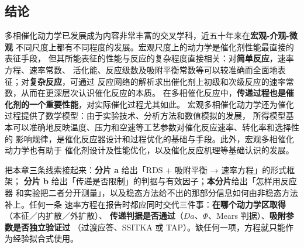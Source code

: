 \subsection{结论}

多相催化动力学已发展成为内容非常丰富的交叉学科，近五十年来在\textbf{宏观-介观-微观}
不同尺度上都有不同程度的发展。宏观尺度上的动力学是催化剂性能最直接的表征手段，
但其所能表征的性能与反应的复杂程度直接相关：对\textbf{简单反应}，速率方程、速率常数、
活化能、反应级数及吸附平衡常数等可以较准确而全面地表征；对\textbf{复杂反应}，可通过
反应网络的解析求出催化剂上初级和次级反应的速率常数，从而在更深层次认识催化反应的本质。
在多相催化反应中，\textbf{传递过程也是催化剂的一个重要性能}，对实际催化过程尤其如此。
宏观多相催化动力学还为催化过程提供了数学模型：由于实验技术、分析方法和数值模拟的发展，
所得模型基本可以准确地反映温度、压力和空速等工艺参数对催化反应速率、转化率和选择性的
影响规律，是催化反应器设计和过程优化的基础与手段。此外，宏观多相催化动力学也有助于
催化剂设计及性能优化，以及催化反应机理等基础认识的发展。

\begin{crosscheck}
把本章三条线索接起来：\textbf{分片 a} 给出「RDS + 吸附平衡 → 速率方程」的形式框架；
\textbf{分片 b} 给出「传递是否限制」的判据与有效因子；\textbf{本分片}给出「怎样用反应器
和实验把二者分开测量」，以及稳态方法给不出的那部分信息如何由非稳态方法补上。任何一条
速率方程在报告时都应同时交代三件事：\textbf{在哪个动力学区取得}（本征／内扩散／外扩散）、
\textbf{传递判据是否通过}（$Da$、$\Phi$、Mears 判据）、\textbf{吸附参数是否独立验证过}
（过渡应答、SSITKA 或 TAP）。缺任何一项，方程就只能作为经验拟合式使用。
\end{crosscheck}

